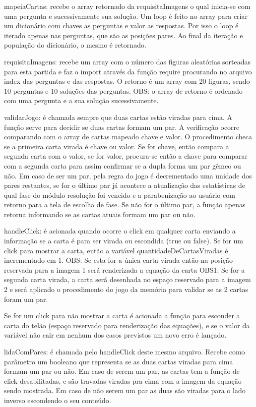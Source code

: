 mapeiaCartas: recebe o array retornado da requisitaImagens o qual inicia-se com uma pergunta e sucessivamente sua solução. Um loop é feito no array para criar um dicionário com chaves as perguntas e valor as respostas. Por isso o loop é iterado apenas nas perguntas, que são as posições pares. Ao final da iteração e população do dicionário, o mesmo é retornado.
	
requisitaImagens: recebe um array com o número das figuras aleatórias sorteadas para esta partida e faz o import através da função require procurando no arquivo index das perguntas e das respostas. O retorno é um array com 20 figuras, sendo 10 perguntas e 10 soluções das perguntas. OBS: o array de retorno é ordenado com uma pergunta e a sua solução sucessivamente.

validarJogo: é chamada sempre que duas cartas estão viradas para cima. A função serve para decidir se duas cartas formam um par. A verificação ocorre comparando com o array de cartas mapeado chave e valor. O procedimento checa se a primeira carta virada é chave ou valor. Se for chave, então compara a segunda carta com o valor, se for valor, procura-se então a chave para comparar com a segunda carta para assim confirmar se a dupla forma um par gêmeo ou não. Em caso de ser um par, pela regra do jogo é decrementado uma unidade dos pares restantes, se for o último par já acontece a atualização das estatísticas de qual fase do módulo resolução foi vencido e a parabenização ao usuário com retorno para a tela de escolha de fase. Se não for o último par, a função apenas retorna informando se as cartas atuais formam um par ou não.


handleClick: é acionada quando ocorre o click em qualquer carta enviando a informação se a carta é para ser virada ou escondida (true ou false). Se for um click para mostrar a carta, então a variável quantidadeDeCartasViradas é incrementado em 1. 
	OBS: Se esta for a única carta virada então na posição reservada para a imagem 1 será renderizada a equação da carta
	OBS1: Se for a segunda carta virada, a carta será desenhada no espaço reservado para a imagem 2 e será aplicado o procedimento do jogo da memória para validar se as 2 cartas foram um par. 

Se for um click para não mostrar a carta é acionada a função para esconder a carta do telão (espaço reservado para renderização das equações), e se o valor da variável não cair em nenhum dos casos previstos um novo erro é lançado.

lidaComPares: é chamada pelo handleClick deste mesmo arquivo. Recebe como parâmetro um booleano que representa se as duas cartas viradas para cima formam um par ou não. Em caso de serem um par, as cartas tem a função de click desabilitadas, e são travadas viradas pra cima com a imagem da equação sendo mostrada. Em caso de não serem um par as duas são viradas para o lado inverso escondendo o seu conteúdo. 

